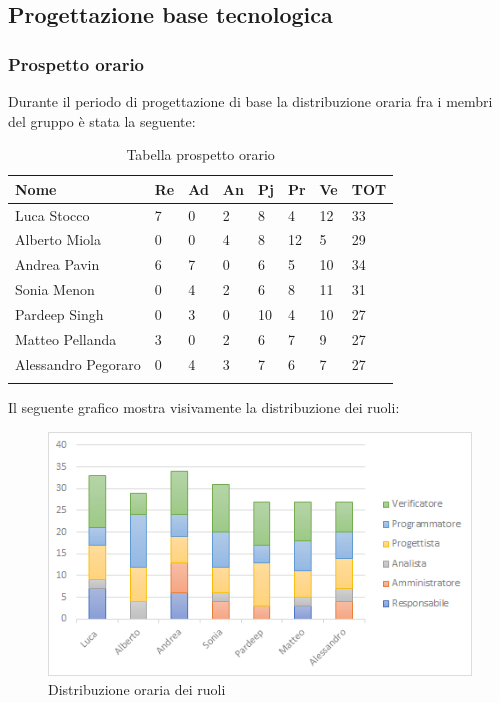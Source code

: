 \subsection{Progettazione base tecnologica}
\subsubsection{Prospetto orario}
Durante il periodo di progettazione di base la distribuzione oraria fra i membri del gruppo è stata la seguente:
\begin{center}
	\renewcommand{\arraystretch}{1.5}
	\begin{longtable}[H]{ p{3.5cm}  p{1.2cm} p{1.2cm}  p{1.2cm} p{1.2cm}  p{1.2cm} p{1.2cm}  p{1.4cm}  }
		\rowcolor{tableHeadYellow}
		\textbf{Nome}   & \textbf{Re} & \textbf{Ad} & \textbf{An} & \textbf{Pj} & \textbf{Pr} & \textbf{Ve} & \textbf{TOT} \\ 
		\endhead
		Luca Stocco       & 7   & 0     & 2 	& 8		& 4 	& 12  	& 33 \\  
		Alberto Miola     & 0   & 0     & 4  	& 8  	& 12   	& 5  	& 29 \\  
		Andrea Pavin      & 6   & 7     & 0   	& 6  	& 5   	& 10  	& 34 \\  
		Sonia Menon       & 0   & 4     & 2   	& 6   	& 8  	& 11 	& 31 \\  
		Pardeep Singh     & 0   & 3     & 0   	& 10  	& 4  	& 10 	& 27 \\  
		Matteo Pellanda   & 3   & 0     & 2  	& 6   	& 7   	& 9  	& 27 \\ 
		Alessandro Pegoraro & 0 & 4		& 3		& 7		&6 		& 7 	& 27\\  
		\rowcolor{white}
		\caption{Tabella prospetto orario}
	\end{longtable}
\end{center}
Il seguente grafico mostra visivamente la distribuzione dei ruoli:
\begin{figure}[H]
	\centering
	\includegraphics[width=15cm,keepaspectratio]{../includes/pics/grafici/grafico5.png}
	\caption{\label{fig:mission}Distribuzione oraria dei ruoli}
\end{figure}
\clearpage
